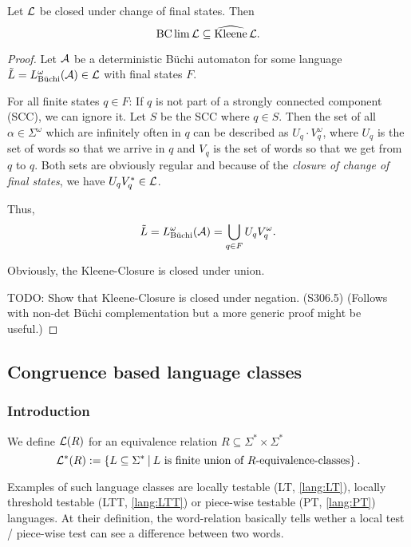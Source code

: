 \begin{lemma}
Let $\mathcal{L}$ be closed under change of final states. Then
\[ \operatorname{BC} \lim \mathcal{L} \subseteq \operatorname{\widehat{Kleene}} \mathcal{L} . \]
\begin{proof}
Let $\mathcal{A}$ be a deterministic Büchi automaton for some language $\tilde L = L^\omega_{\text{Büchi}}(\mathcal{A}) \in \mathcal{L}$ with final states $F$.

For all finite states $q \in F$: If $q$ is not part of a strongly connected component (SCC), we can ignore it. Let $S$ be the SCC where $q \in S$. Then the set of all $\alpha \in \Sigma^\omega$ which are infinitely often in $q$ can be described as $U_q \cdot V_q^\omega$, where $U_q$ is the set of words so that we arrive in $q$ and $V_q$ is the set of words so that we get from $q$ to $q$. Both sets are obviously regular and because of the \emph{closure of change of final states}, we have $U_q V_q^* \in \mathcal{L}$.

Thus,
\[ \tilde L = L^\omega_{\text{Büchi}}(\mathcal{A}) = \bigcup_{q \in F} U_q V_q^\omega . \]

Obviously, the Kleene-Closure is closed under union.

TODO: Show that Kleene-Closure is closed under negation. (S306.5) (Follows with non-det Büchi complementation but a more generic proof might be useful.)
\end{proof}
\end{lemma}


\subsection{Congruence based language classes}

\subsubsection{Introduction}
\label{gen:R-automata}

\begin{mydef}
We define $\mathcal{L}(R)$ for an equivalence relation $R\subseteq\Sigma^* \times \Sigma^*$
\[ \Lang^*(R) := \Set{L \subseteq \Sigma^*}{L \text{ is finite union of $R$-equivalence-classes}} . \]
\end{mydef}

Examples of such language classes are locally testable (LT, \cref{lang:LT}), locally threshold testable (LTT, \cref{lang:LTT}) or piece-wise testable (PT, \cref{lang:PT}) languages. At their definition, the word-relation basically tells wether a local test / piece-wise test can see a difference between two words.

